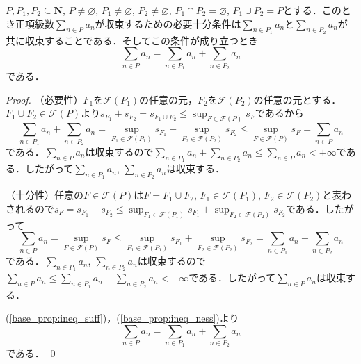 \documentclass[12pt,a4paper]{jsarticle}
\newcommand{\nat}{\mathbf{N}}
\newcommand{\calF}{\mathcal{F}}
\begin{document}
\begin{proposition}\label{base_prop}
    $P, P_1, P_2 \subseteq \nat$, $P \not= \varnothing$, $P_1 \not= \varnothing$, $P_2 \not= \varnothing$, $P_1 \cap P_2 = \varnothing$, $P_1 \cup P_2 = P$とする．このとき正項級数$\sum_{n \in P} a_n$が収束するための必要十分条件は$\sum_{n \in P_1} a_n$と$\sum_{n \in P_2} a_n$が共に収束することである．そしてこの条件が成り立つとき
    \begin{equation*}
        \sum_{n \in P} a_n = \sum_{n \in P_1} a_n + \sum_{n \in P_2} a_n
    \end{equation*}
    である．
\end{proposition}
\begin{proof}
    （必要性）$F_1$を$\calF(P_1)$の任意の元，$F_2$を$\calF(P_2)$の任意の元とする．$F_1 \cup F_2 \in \calF(P)$より$s_{F_1} + s_{F_2} = s_{F_1 \cup F_2} \leq \sup_{F \in \calF(P)} s_F$であるから
    \begin{equation}
        \sum_{n \in P_1} a_n + \sum_{n \in P_2} a_n = \sup_{F_1 \in \calF(P_1)} s_{F_1} + \sup_{F_2 \in \calF(P_2)} s_{F_2} \leq \sup_{F \in \calF(P)} s_F = \sum_{n \in P} a_n \label{base_prop:ineq_suff}
    \end{equation}
    である．$\sum_{n \in P} a_n$は収束するので$\sum_{n \in P_1} a_n + \sum_{n \in P_2} a_n \leq \sum_{n \in P} a_n < +\infty$である．したがって$\sum_{n \in P_1} a_n$, $\sum_{n \in P_2} a_n$は収束する．

    （十分性）任意の$F \in \calF(P)$は$F = F_1 \cup F_2$, $F_1 \in \calF(P_1)$, $F_2 \in \calF(P_2)$と表わされるので$s_F = s_{F_1} + s_{F_2} \leq \sup_{F_1 \in \calF(P_1)} s_{F_1} + \sup_{F_2 \in \calF(P_2)} s_{F_2}$である．したがって
    \begin{equation}
        \sum_{n \in P} a_n = \sup_{F \in \calF(P)} s_F \leq \sup_{F_1 \in \calF(P_1)} s_{F_1} + \sup_{F_2 \in \calF(P_2)} s_{F_2} = \sum_{n \in P_1} a_n + \sum_{n \in P_2} a_n \label{base_prop:ineq_ness}
    \end{equation}
    である．$\sum_{n \in P_1} a_n$, $\sum_{n \in P_2} a_n$は収束するので$\sum_{n \in P} a_n \leq \sum_{n \in P_1} a_n + \sum_{n \in P_2} a_n < +\infty$である．したがって$\sum_{n \in P} a_n$は収束する．

    (\ref{base_prop:ineq_suff})，(\ref{base_prop:ineq_ness})より
    \begin{equation*}
        \sum_{n \in P} a_n = \sum_{n \in P_1} a_n + \sum_{n \in P_2} a_n
    \end{equation*}
    である．
    \qed
\end{proof}
\end{document}
